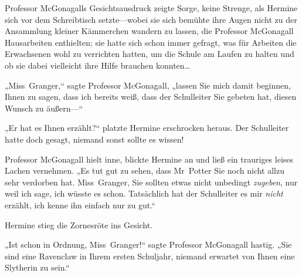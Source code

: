 Professor McGonagalls Gesichtsausdruck zeigte Sorge, keine Strenge, als Hermine sich vor dem Schreibtisch setzte—wobei sie sich bemühte ihre Augen nicht zu der Ansammlung kleiner Kämmerchen wandern zu lassen, die Professor McGonagall Hausarbeiten enthielten; sie hatte sich schon immer gefragt, was für Arbeiten die Erwachsenen wohl zu verrichten hatten, um die Schule am Laufen zu halten und ob sie dabei vielleicht ihre Hilfe brauchen konnten…

„Miss~Granger,“ sagte Professor McGonagall, „lassen Sie mich damit beginnen, Ihnen zu sagen, dass ich bereits weiß, dass der Schulleiter Sie gebeten hat, diesen Wunsch zu äußern—“

„Er hat es Ihnen erzählt?“ platzte Hermine erschrocken heraus. Der Schulleiter hatte doch gesagt, niemand sonst sollte es wissen!

Professor McGonagall hielt inne, blickte Hermine an und ließ ein trauriges leises Lachen vernehmen. „Es tut gut zu sehen, dass Mr~Potter Sie noch nicht allzu sehr verdorben hat. Miss~Granger, Sie sollten etwas nicht unbedingt \emph{zugeben}, nur weil ich sage, ich wüsste es schon. Tatsächlich hat der Schulleiter es mir \emph{nicht} erzählt, ich kenne ihn einfach nur zu gut.“

Hermine stieg die Zornesröte ins Gesicht.

„Ist schon in Ordnung, Miss~Granger!“ sagte Professor McGonagall hastig. „Sie sind eine Ravenclaw in Ihrem ersten Schuljahr, niemand erwartet von Ihnen eine Slytherin zu sein.“

